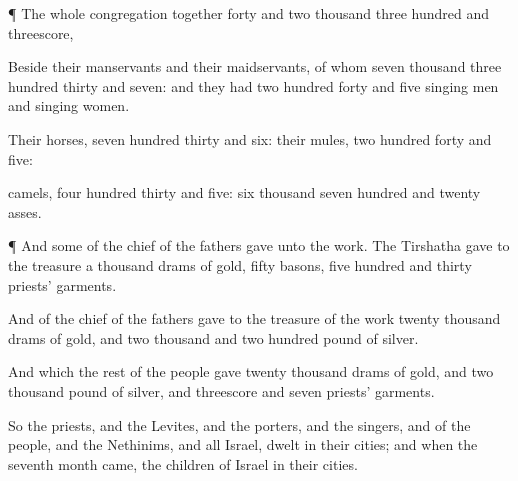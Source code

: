 {\par }{\PP {}¶ The whole
congregation
together
{}
forty and two
thousand
three
hundred and
threescore,

Beside their
manservants and their
maidservants, of whom
{}
seven
thousand
three
hundred
thirty and
seven: and they had two
hundred
forty and
five singing
men and singing
women.

Their
horses,
seven
hundred
thirty and
six: their
mules, two
hundred
forty and
five:

camels,
four
hundred
thirty and
five:
six
thousand
seven
hundred and
twenty
asses.


\par }{\PP {}¶ And some
of the
chief of the
fathers
gave unto the
work. The
Tirshatha
gave to the
treasure a
thousand
drams of
gold,
fifty
basons,
five
hundred and
thirty
priests’
garments.

And
{} of the
chief of the
fathers
gave to the
treasure of the
work
twenty
thousand
drams of
gold, and two
thousand and two
hundred
pound of
silver.

And
{} which the
rest of the
people
gave
{}
twenty
thousand
drams of
gold, and two
thousand
pound of
silver, and
threescore and
seven
priests’
garments.

So the
priests, and the
Levites, and the
porters, and the
singers, and
{} of the
people, and the
Nethinims, and all
Israel,
dwelt in their
cities; and when the
seventh
month
came, the
children of
Israel
{} in their
cities.




\par }

